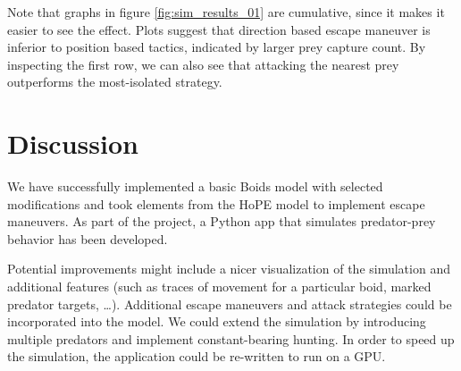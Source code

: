 \documentclass[9pt]{pnas-new}
\begin{document}
Note that graphs in figure \ref{fig:sim_results_01} are cumulative, since it makes it easier to see the effect.
Plots suggest that direction based escape maneuver is inferior to position based tactics, indicated by larger prey capture count.
By inspecting the first row, we can also see that attacking the nearest prey outperforms the most-isolated strategy.

\pagebreak

\section*{Discussion}

We have successfully implemented a basic Boids model with selected modifications and took elements from
the HoPE model to implement escape maneuvers. As part of the project, a Python app that simulates
predator-prey behavior has been developed.

Potential improvements might include a nicer visualization of the simulation and additional features (such as
traces of movement for a particular boid, marked predator targets, \ldots). Additional escape maneuvers
and attack strategies could be incorporated into the model. We could extend the simulation by introducing multiple predators
and implement constant-bearing hunting. In order to speed up the simulation, the application could be re-written
to run on a GPU.


\showacknow %


\begin{multicols}{2}
    \section*{\bibname}
    
\end{multicols}
\end{document}
